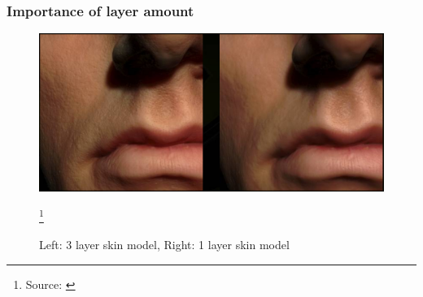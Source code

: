 \documentclass{f4_beamer_metropolis}
\newcommand\blfootnote[1]{%
  \begingroup
  \renewcommand\thefootnote{}\footnote{#1}%
  \addtocounter{footnote}{-1}%
  \endgroup
}
\begin{document}
\begin{frame}[t]
  \frametitle{Importance of layer amount}
  \begin{figure}[!h]
    \centering
    \includegraphics[scale=0.25,keepaspectratio]{./images/importance-of-layer-amount}
      \caption{Left: 3 layer skin model, Right: 1 layer skin model}
    \blfootnote{Source: \citet{efficient-human-skin-rendering}}
  \end{figure}

\end{frame}
\end{document}
